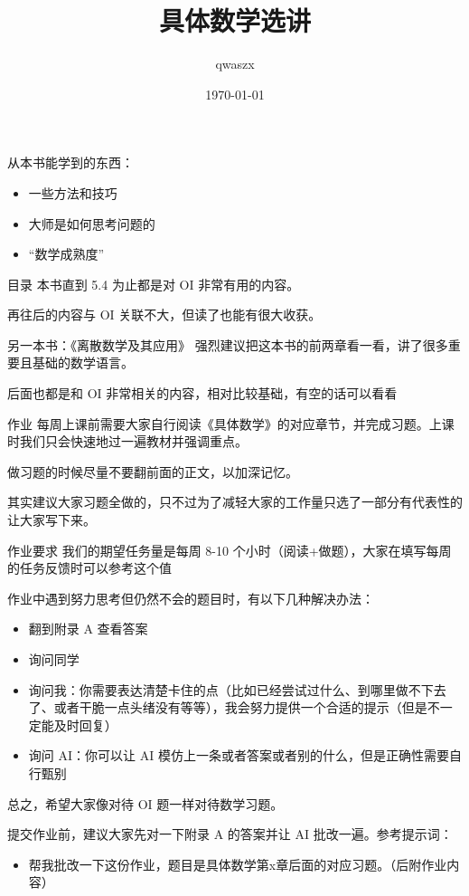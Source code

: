 \documentclass[11pt,aspectratio=169]{beamer}
\title{具体数学选讲}
\author{qwaszx}
\date{\today}
\begin{document}
\begin{frame}
  \titlepage
\end{frame}

\begin{frame}
    从本书能学到的东西：

    \begin{itemize}
        \item 一些方法和技巧
        \item 大师是如何思考问题的
        \item “数学成熟度”
    \end{itemize}
\end{frame}
\begin{frame}{目录}
    本书直到 5.4 为止都是对 OI 非常有用的内容。

    再往后的内容与 OI 关联不大，但读了也能有很大收获。
\end{frame}

\begin{frame}{另一本书：《离散数学及其应用》}
    强烈建议把这本书的前两章看一看，讲了很多重要且基础的数学语言。

    后面也都是和 OI 非常相关的内容，相对比较基础，有空的话可以看看
\end{frame}

\begin{frame}{作业}
    每周上课前需要大家自行阅读《具体数学》的对应章节，并完成习题。上课时我们只会快速地过一遍教材并强调重点。

    做习题的时候尽量不要翻前面的正文，以加深记忆。

    其实建议大家习题全做的，只不过为了减轻大家的工作量只选了一部分有代表性的让大家写下来。
\end{frame}
\begin{frame}{作业要求}
    我们的期望任务量是每周 8-10 个小时（阅读+做题），大家在填写每周的任务反馈时可以参考这个值

    作业中遇到努力思考但仍然不会的题目时，有以下几种解决办法：
    \begin{itemize}
        \item 翻到附录 A 查看答案
        \item 询问同学
        \item 询问我：你需要表达清楚卡住的点（比如已经尝试过什么、到哪里做不下去了、或者干脆一点头绪没有等等），我会努力提供一个合适的提示（但是不一定能及时回复）
        \item 询问 AI：你可以让 AI 模仿上一条或者答案或者别的什么，但是正确性需要自行甄别
    \end{itemize}
    总之，希望大家像对待 OI 题一样对待数学习题。

    提交作业前，建议大家先对一下附录 A 的答案并让 AI 批改一遍。参考提示词：
    \begin{itemize}
        \item 帮我批改一下这份作业，题目是具体数学第x章后面的对应习题。（后附作业内容）
    \end{itemize}
\end{frame}








\end{document}

